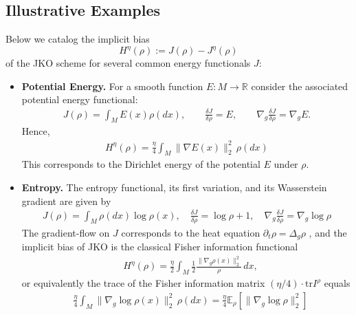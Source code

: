 \documentclass[reqno,11pt,letterpaper]{amsart}
\theoremstyle{plain}
\theoremstyle{definition}
\theoremstyle{remark}
\DeclareMathOperator{\Tr}{\mathbf{tr}}
\newcommand{\gives}{\rightarrow}
\newcommand{\R}{\mathbb R}
\newcommand{\tr}{\mathrm{tr}}
\begin{document}
\subsection{Illustrative Examples}\label{sec:JKO_examples}

Below we catalog the implicit bias 
\[
H^{\eta}(\rho):=J(\rho)-J^\eta(\rho)
\]
of the JKO scheme for several common energy functionals $J$:

\begin{itemize}[leftmargin=*]
    \item \textbf{Potential Energy.} For a smooth function $E:M\gives \R$ consider the associated potential energy functional:
\begin{align*}
J(\rho) = \int_M E(x)\rho(dx) , \qquad \frac{\delta J}{\delta \rho} = E, \qquad \nabla_g \frac{\delta J}{\delta \rho} = \nabla_g E.
\end{align*}
Hence, 
\begin{align}
    \label{eq:potential-ib}H^{\eta}(\rho)= \frac{\eta}{4} \int_M \lVert \nabla E(x) \rVert_{2}^{2} \,\rho(dx) 
\end{align}
This corresponds to the Dirichlet energy of the potential $E$ under $\rho$.
\item \textbf{Entropy.} The entropy functional, its first variation, and its Wasserstein gradient are given by
    \begin{align*}
    J(\rho) = \int_M  \rho(dx)\log \rho(x) , \quad \frac{\delta J}{\delta \rho} = \log \rho +1, \quad \nabla_g \frac{\delta J}{\delta \rho} = \nabla_g \log \rho
    \end{align*}
    The gradient-flow on $J$ corresponds to the heat equation $\partial_{t}\rho = \Delta_g \rho$ \cite{Jordan1998}, and the implicit bias of JKO is the classical Fisher information functional \cite{Gianazza2008, Amari2016}
\begin{align}
    &H^{\eta}(\rho)= \frac{\eta}{2} \int_M \frac{1}{2}\frac{\lVert \nabla_g  \rho (x)\rVert_{2}^{2}}{\rho} \,dx,
\end{align}
or equivalently the trace of the Fisher information matrix $(\eta/4) \cdot\tr I^{\rho}$  equals \cite{Amari2016}
\begin{align}
    &\frac{\eta}{4} \int_M \lVert \nabla_g \log \rho (x)\rVert_{2}^{2} \,\rho(dx) = \frac{\eta}{4}\mathbb{E}_{\rho}\left[\lVert \nabla_g \log \rho \rVert_{2}^{2}\right]
\end{align}

\end{itemize}
\end{document}
